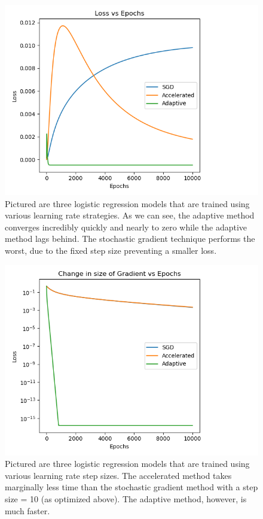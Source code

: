 \documentclass{article}
\begin{document}
\begin{figure}[h]{
    \centering
    \includegraphics[width=.8\textwidth]{loss.png}
    \caption{Pictured are three logistic regression models that are trained using various learning rate strategies. As we can see, the adaptive method converges incredibly quickly and nearly to zero while the adaptive method lags behind. The stochastic gradient technique performs the worst, due to the fixed step size preventing a smaller loss.}
    \label{fig:my_label}
    }
\end{figure}

\begin{figure}[h]{
    \centering
    \includegraphics[width=.8\textwidth]{gradient_size.png}
    \caption{Pictured are three logistic regression models that are trained using various learning rate step sizes. The accelerated method takes marginally less time than the stochastic gradient method with a step size = 10 (as optimized above). The adaptive method, however, is much faster.}
    \label{fig:my_label}
    }
\end{figure}
\end{document}
